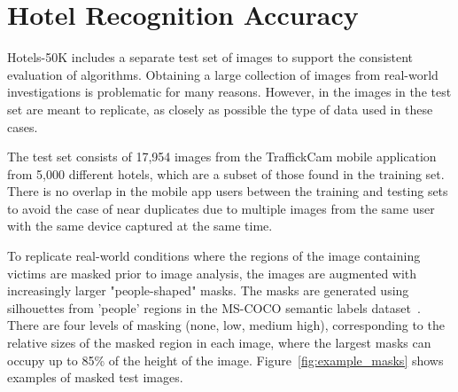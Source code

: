 \chapter{Hotel Recognition Accuracy}
\label{ch:5}

Hotels-50K includes a separate test set of images to support the consistent evaluation of 
algorithms. Obtaining a large collection of images from real-world investigations
is problematic for many reasons. However, in the images in the test set are
meant to replicate, as closely as possible the type of data used in these cases.

The test set consists of 17,954 images from the TraffickCam mobile application from 5,000 different 
hotels, which are a subset of those found in the training set. There is no overlap in the 
mobile app users between the training and testing sets to avoid the case of near
duplicates due to multiple images from the same user with the same device captured at the same time.

To replicate real-world conditions where the regions of the image containing victims are 
masked prior to image analysis, the images are augmented with increasingly 
larger "people-shaped" masks. The masks are generated using silhouettes from 'people' regions 
in the MS-COCO semantic labels dataset~\cite{mscoco}. There are four levels of masking (none, low, medium high), corresponding to the relative sizes of the masked region in each image, where the largest masks can occupy up to 85\% of the height of the image. Figure~\ref{fig:example_masks} shows examples of masked test images.

